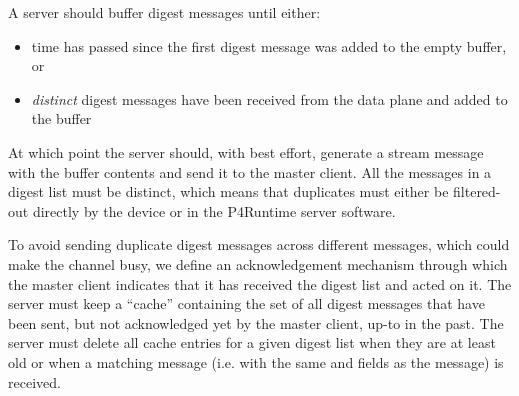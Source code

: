 \documentclass[11pt]{article}
\begin{document}
{%
\noindent{}A server should buffer digest messages until either:%

\begin{itemize}[noitemsep,topsep=\mdcompacttopsep]%

\item{} time has passed since the first digest message was added to
the empty buffer, or%

\item{} \emph{distinct} digest messages have been received from the
data plane and added to the buffer%
\end{itemize}%

\noindent{}At which point the server should, with best effort, generate a 
stream message with the buffer contents and send it to the master client. All
the messages in a digest list must be distinct, which means that duplicates must
either be filtered-out directly by the device or in the P4Runtime server
software.%

To avoid sending duplicate digest messages across different 
messages, which could make the channel busy, we define an acknowledgement
mechanism through which the master client indicates that it has received the
digest list and acted on it. The server must keep a \textquotedblleft{}cache\textquotedblright{} containing the set
of all digest messages that have been sent, but not acknowledged yet by the
master client, up-to  in the past. The server must delete all
cache entries for a given digest list when they are at least 
old or when a matching  message (i.e. with the same 
and  fields as the  message) is received.%

}
\end{document}

